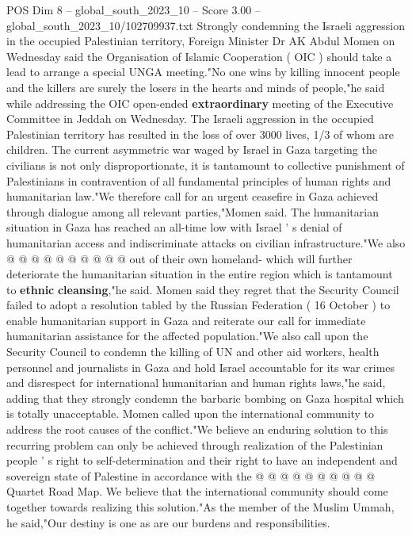 \begin{textsample}{POS Dim 8 – global\_south\_2023\_10 – Score 3.00 – global\_south\_2023\_10/102709937.txt}  \label{ex:f8_pos_357}
Strongly condemning the Israeli aggression in the occupied Palestinian territory, Foreign Minister Dr AK Abdul Momen on Wednesday said the Organisation of Islamic Cooperation ( OIC ) should take a lead to arrange a special UNGA meeting."No one wins by killing innocent people and the killers are surely the losers in the hearts and minds of people,"he said while addressing the OIC open-ended \textbf{extraordinary} meeting of the Executive Committee in Jeddah on Wednesday.
The Israeli aggression in the occupied Palestinian territory has resulted in the loss of over 3000 lives, 1/3 of whom are children.
The current asymmetric war waged by Israel in Gaza targeting the civilians is not only disproportionate, it is tantamount to collective punishment of Palestinians in contravention of all fundamental principles of human rights and humanitarian law."We therefore call for an urgent ceasefire in Gaza achieved through dialogue among all relevant parties,"Momen said.
The humanitarian situation in Gaza has reached an all-time low with Israel ' s denial of humanitarian access and indiscriminate attacks on civilian infrastructure."We also @ @ @ @ @ @ @ @ @ @ out of their own homeland- which will further deteriorate the humanitarian situation in the entire region which is tantamount to \textbf{ethnic} \textbf{cleansing},"he said.
Momen said they regret that the Security Council failed to adopt a resolution tabled by the Russian Federation ( 16 October ) to enable humanitarian support in Gaza and reiterate our call for immediate humanitarian assistance for the affected population."We also call upon the Security Council to condemn the killing of UN and other aid workers, health personnel and journalists in Gaza and hold Israel accountable for its war crimes and disrespect for international humanitarian and human rights laws,"he said, adding that they strongly condemn the barbaric bombing on Gaza hospital which is totally unacceptable.
Momen called upon the international community to address the root causes of the conflict."We believe an enduring solution to this recurring problem can only be achieved through realization of the Palestinian people ' s right to self-determination and their right to have an independent and sovereign state of Palestine in accordance with the @ @ @ @ @ @ @ @ @ @ Quartet Road Map.
We believe that the international community should come together towards realizing this solution."As the member of the Muslim Ummah, he said,"Our destiny is one as are our burdens and responsibilities.

\end{textsample}
